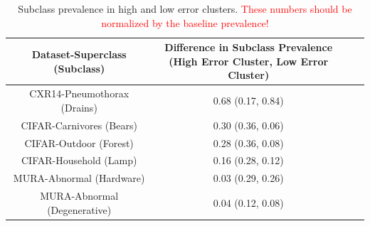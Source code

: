\documentclass{article}
\begin{document}
 \begin{table}[]
 \centering
\begin{tabular}{|c|c|c|c|}
\hline
 Dataset-Superclass (Subclass) & \makecell{Difference in Subclass Prevalence \\ (High Error Cluster, Low Error Cluster)} \\
 \hline
 CXR14-Pneumothorax (Drains) & 0.68 (0.17, 0.84) \\
 CIFAR-Carnivores (Bears) & 0.30 (0.36, 0.06) \\
 CIFAR-Outdoor (Forest) & 0.28 (0.36, 0.08) \\
 CIFAR-Household (Lamp) & 0.16 (0.28, 0.12) \\
 MURA-Abnormal (Hardware) & 0.03 (0.29, 0.26) \\
 MURA-Abnormal (Degenerative) & 0.04 (0.12, 0.08) \\
 \hline
\end{tabular}
\caption{ Subclass prevalence in high and low error clusters. \textcolor{red}{These numbers should be normalized by the baseline prevalence!}}
\label{tab:clustercifar-1}
\vspace{- 8 mm}
\end{table}


%
\end{document}
